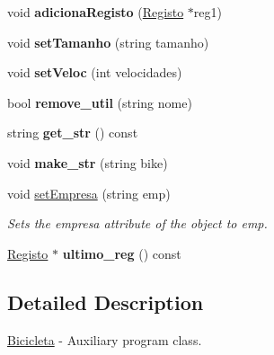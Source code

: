\begin{DoxyCompactItemize}
\item 
\hypertarget{class_bicicleta_a2520579ebcc40f9cc2ee05392f3004a2}{void {\bfseries adiciona\+Registo} (\hyperlink{class_registo}{Registo} $\ast$reg1)}\label{class_bicicleta_a2520579ebcc40f9cc2ee05392f3004a2}

\item 
\hypertarget{class_bicicleta_a28df135cc7d332d43ca85647fa60175a}{void {\bfseries set\+Tamanho} (string tamanho)}\label{class_bicicleta_a28df135cc7d332d43ca85647fa60175a}

\item 
\hypertarget{class_bicicleta_aef781f0496eab00a16c354d52f9f1686}{void {\bfseries set\+Veloc} (int velocidades)}\label{class_bicicleta_aef781f0496eab00a16c354d52f9f1686}

\item 
\hypertarget{class_bicicleta_a791cdbbf5016ea3a0229915b84a52a04}{bool {\bfseries remove\+\_\+util} (string nome)}\label{class_bicicleta_a791cdbbf5016ea3a0229915b84a52a04}

\item 
\hypertarget{class_bicicleta_a570101dbac9300d107433c52ae698915}{string {\bfseries get\+\_\+str} () const }\label{class_bicicleta_a570101dbac9300d107433c52ae698915}

\item 
\hypertarget{class_bicicleta_aff75cc7f6d1a554a8b7c663834115575}{void {\bfseries make\+\_\+str} (string bike)}\label{class_bicicleta_aff75cc7f6d1a554a8b7c663834115575}

\item 
void \hyperlink{class_bicicleta_ae48de57881e09ac89a84558c79894640}{set\+Empresa} (string emp)
\begin{DoxyCompactList}\small\item\em Sets the empresa attribute of the object to emp. \end{DoxyCompactList}\item 
\hypertarget{class_bicicleta_a0f6d8c8efea7822160a397ef040438d1}{\hyperlink{class_registo}{Registo} $\ast$ {\bfseries ultimo\+\_\+reg} () const }\label{class_bicicleta_a0f6d8c8efea7822160a397ef040438d1}

\end{DoxyCompactItemize}


\subsection{Detailed Description}
\hyperlink{class_bicicleta}{Bicicleta} -\/ Auxiliary program class. 

